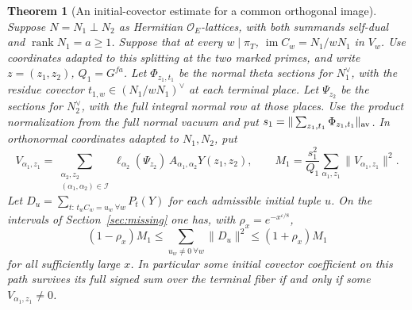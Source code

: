 \documentclass[a4paper,11pt]{article}
\newtheorem{theorem}[proposition]{Theorem}
\theoremstyle{definition}
\theoremstyle{remark}
\numberwithin{equation}{section}
\begin{document}
\begin{theorem}[An initial-covector estimate for a common orthogonal image]
\label{thm:splitcoherent391}
Suppose \(N=N_1\perp N_2\) as Hermitian
\(\mathcal O_E\)-lattices, with both summands self-dual and
\(\operatorname{rank}N_1=a\ge1\). Suppose that at every
\(w\mid\pi_T\), \(\operatorname{im}C_w=N_1/wN_1\) in \(V_w\).
Use coordinates adapted to this splitting at the two marked
primes, and write \(z=(z_1,z_2)\), \(Q_1=G^{fa}\). Let
\(\Phi_{z_1,t_1}\) be the normal theta sections for \(N_1^\vee\),
with the residue covector \(t_{1,w}\in(N_1/wN_1)^\vee\)
at each terminal place. Let \(\Psi_{z_2}\) be the sections
for \(N_2^\vee\), with the full integral normal row at those
places. Use the product normalization from the full normal
vacuum and put \(s_1=\|\sum_{z_1,t_1}\Phi_{z_1,t_1}\|_{\rm av}\).
In orthonormal coordinates adapted to \(N_1,N_2\), put
\[
  V_{\alpha_1,z_1}
    =\sum_{\substack{\alpha_2,z_2\\
                       (\alpha_1,\alpha_2)\in\mathcal I}}
        \ell_{\alpha_2}(\Psi_{z_2})\,
                    A_{\alpha_1,\alpha_2}Y(z_1,z_2),\qquad
  M_1=\frac{s_1^2}{Q_1}\sum_{\alpha_1,z_1}\|V_{\alpha_1,z_1}\|^2 .
\]
Let \(D_u=\sum_{t:\,t_w C_w=u_w\ \forall w}P_t(Y)\) for each
admissible initial tuple \(u\). On the intervals of
Section~\ref{sec:missing} one has, with \(\rho_x=e^{-x^{\varepsilon/8}}\),
\[
        (1-\rho_x)M_1
       \le \sum_{u_w\ne0\ \forall w}\|D_u\|^2
       \le (1+\rho_x)M_1
\]
for all sufficiently large \(x\). In particular some initial
covector coefficient on this path survives its full signed
sum over the terminal fiber if and only if some
\(V_{\alpha_1,z_1}\ne0\).
\end{theorem}
\end{document}

